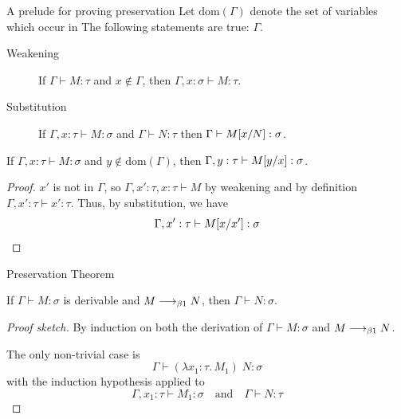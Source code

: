 \begin{frame}{A prelude for proving preservation}
  Let $\mathrm{dom}(\Gamma)$ denote the set of variables which occur in
  The following statements are true:
  $\Gamma$. 
    \begin{description}
      \item[Weakening] If $\Gamma \vdash M : \tau$ and $x \not\in \Gamma$, then
        $\Gamma, x : \sigma \vdash M : \tau$. 
      \item[Substitution] If $\Gamma, x : \tau \vdash M : \sigma$ and $\Gamma
        \vdash N : \tau$ then $\Gamma \vdash M[{x}/{N}] : \sigma$.
    \end{description}

  \begin{corollary}
    If $\Gamma, x : \tau \vdash M :\sigma$ and $y \not\in \mathrm{dom}(\Gamma)$, then $ \Gamma, y : \tau \vdash M[{y}/{x}] :
    \sigma$. 
  \end{corollary}
  \begin{proof}
    $x'$ is not in $\Gamma$, so 
      $\Gamma, x' : \tau, x : \tau \vdash M$
    by weakening and by definition $\Gamma, x' : \tau \vdash x' : \tau$.
    Thus, by substitution, we have
    \[
      \Gamma, x' : \tau \vdash M[{x}/{x'}] : \sigma
    \]
  \end{proof}
\end{frame}

\begin{frame}{Preservation Theorem}
  \begin{theorem}
    If $\Gamma \vdash M : \sigma$ is derivable and $M \longrightarrow_{\beta1} N$, then $\Gamma \vdash N : \sigma$. 
  \end{theorem}
  \begin{proof}[Proof sketch]
  By induction on both the derivation of $\Gamma \vdash M :
  \sigma$ and $M \longrightarrow_{\beta1} N$.

  The only non-trivial case is
  \[
    \Gamma \vdash (\lambda  x_1 : \tau .\, M_1)\; N : \sigma%
  \]
  with the induction hypothesis applied to
  \[
    \Gamma, x_1 : \tau \vdash M_1 : \sigma
    \quad\text{and}\quad
    \Gamma \vdash N : \tau
  \]
\end{proof}
  
\end{frame}


